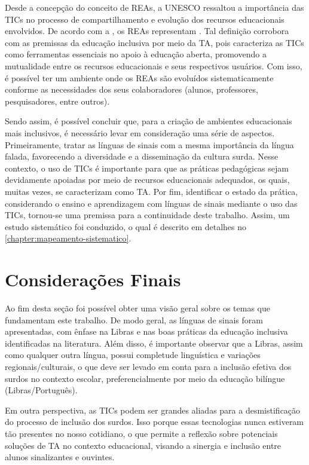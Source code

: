 Desde a concepção do conceito de REAs, a UNESCO ressaltou a importância das TICs no processo de compartilhamento e evolução dos recursos educacionais envolvidos. De acordo com a , os REAs representam . Tal definição corrobora com as premissas da educação inclusiva por meio da TA, pois caracteriza as TICs como ferramentas essenciais no apoio à educação aberta, promovendo a mutualidade entre os recursos educacionais e seus respectivos usuários. Com isso, é possível ter um ambiente onde os REAs são evoluídos sistematicamente conforme as necessidades dos seus colaboradores (alunos, professores, pesquisadores, entre outros).

Sendo assim, é possível concluir que, para a criação de ambientes educacionais mais inclusivos, é necessário levar em consideração uma série de aspectos. Primeiramente, tratar as línguas de sinais com a mesma importância da língua falada, favorecendo a diversidade e a disseminação da cultura surda. Nesse contexto, o uso de TICs é importante para que as práticas pedagógicas sejam devidamente apoiadas por meio de recursos educacionais adequados, os quais, muitas vezes, se caracterizam como TA. Por fim, identificar o estado da prática, considerando o ensino e aprendizagem com línguas de sinais mediante o uso das TICs, tornou-se uma premissa para a continuidade deste trabalho. Assim, um estudo sistemático foi conduzido, o qual é descrito em detalhes no \autoref{chapter:mapeamento-sistematico}.

\section{Considerações Finais}
\label{fundamentacao-teorica:fim}

Ao fim desta seção foi possível obter uma visão geral sobre os temas que fundamentam este trabalho. De modo geral, as línguas de sinais foram apresentadas, com ênfase na Libras e nas boas práticas da educação inclusiva identificadas na literatura. Além disso, é importante observar que a Libras, assim como qualquer outra língua, possui completude linguística e variações regionais/culturais, o que deve ser levado em conta para a inclusão efetiva dos surdos no contexto escolar, preferencialmente por meio da educação bilíngue (Libras/Português).

Em outra perspectiva, as TICs podem ser grandes aliadas para a desmistificação do processo de inclusão dos surdos. Isso porque essas tecnologias nunca estiveram tão presentes no nosso cotidiano, o que permite a reflexão sobre potenciais soluções de TA no contexto educacional, visando a sinergia e inclusão entre alunos sinalizantes e ouvintes.

